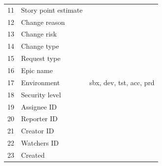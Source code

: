 \documentclass[sigconf]{acmart}
\begin{document}
\begin{table}[h]
\begin{tabular}{|lll|}
11                      & Story point estimate        &                                                                                                                      \\
12                      & Change reason               &                                                                                                                      \\
13                      & Change risk                 &                                                                                                                      \\
14                      & Change type                 &                                                                                                                      \\
15                      & Request type                &                                                                                                                      \\
16                      & Epic name                   &                                                                                                                      \\
17                      & Environment                 & sbx, dev, tst, acc, prd                                                                                              \\
18                      & Security level              &                                                                                                                      \\
19                      & Assignee ID                 &                                                                                                                      \\
20                      & Reporter ID                 &                                                                                                                      \\
21                      & Creator ID                  &                                                                                                                      \\
22                      & Watchers ID                 &                                                                                                                      \\
23                      & Created                     &                                                                                                                      \\

\end{tabular}
\end{table}
\end{document}
